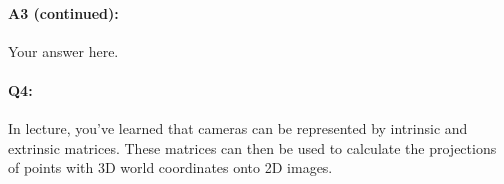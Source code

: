 


\pagebreak
\paragraph{A3 (continued):} Your answer here.


\pagebreak
\paragraph{Q4:} In lecture, you've learned that cameras can be represented by intrinsic and extrinsic matrices. These matrices can then be used to calculate the projections of points with 3D world coordinates onto 2D images. 
